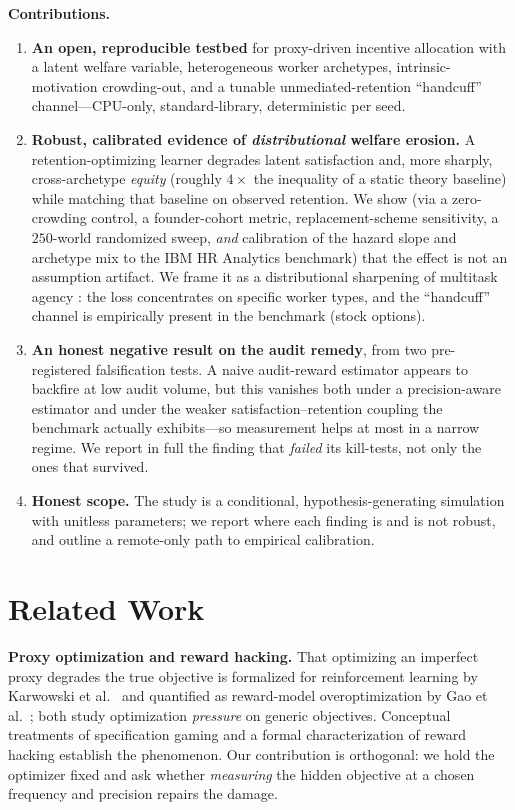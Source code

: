 \documentclass[11pt]{article}
\begin{document}
\noindent\textbf{Contributions.}
\begin{enumerate}
  \item \textbf{An open, reproducible testbed} for proxy-driven incentive
  allocation with a latent welfare variable, heterogeneous worker archetypes,
  intrinsic-motivation crowding-out, and a tunable unmediated-retention
  ``handcuff'' channel---CPU-only, standard-library, deterministic per seed.
  \item \textbf{Robust, calibrated evidence of \emph{distributional} welfare
  erosion.} A retention-optimizing learner degrades latent satisfaction and,
  more sharply, cross-archetype \emph{equity} (roughly $4\times$ the inequality of
  a static theory baseline) while matching that baseline on observed retention.
  We show (via a zero-crowding control, a founder-cohort metric,
  replacement-scheme sensitivity, a $250$-world randomized sweep, \emph{and}
  calibration of the hazard slope and archetype mix to the IBM HR Analytics
  benchmark) that the effect is not an assumption artifact. We frame it as a
  distributional sharpening of multitask agency \citep{holmstrom1991}: the loss
  concentrates on specific worker types, and the ``handcuff'' channel is
  empirically present in the benchmark (stock options).
  \item \textbf{An honest negative result on the audit remedy}, from two
  pre-registered falsification tests. A naive audit-reward estimator appears to
  backfire at low audit volume, but this vanishes both under a precision-aware
  estimator and under the weaker satisfaction--retention coupling the benchmark
  actually exhibits---so measurement helps at most in a narrow regime. We report
  in full the finding that \emph{failed} its kill-tests, not only the ones that
  survived.
  \item \textbf{Honest scope.} The study is a conditional, hypothesis-generating
  simulation with unitless parameters; we report where each finding is and is
  not robust, and outline a remote-only path to empirical calibration.
\end{enumerate}

\section{Related Work}
\textbf{Proxy optimization and reward hacking.} That optimizing an imperfect
proxy degrades the true objective is formalized for reinforcement learning by
Karwowski et al.~\citep{karwowski2024} and quantified as reward-model
overoptimization by Gao et al.~\citep{gao2023}; both study optimization
\emph{pressure} on generic objectives.
Conceptual treatments of specification gaming \citep{amodei2016,krakovna2020}
and a formal characterization of reward hacking \citep{skalse2022} establish the
phenomenon. Our contribution is orthogonal: we hold the optimizer fixed and ask
whether \emph{measuring} the hidden objective at a chosen frequency and
precision repairs the damage.
\end{document}
